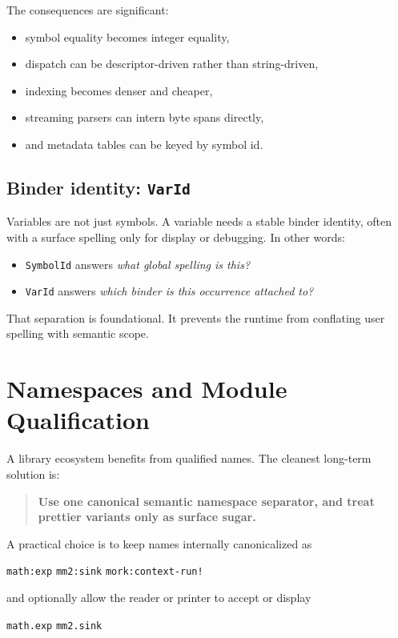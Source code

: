\documentclass[11pt]{article}
\newcommand{\symid}{\texttt{SymbolId}}
\newcommand{\varid}{\texttt{VarId}}
\begin{document}
The consequences are significant:
\begin{itemize}[leftmargin=2em]
  \item symbol equality becomes integer equality,
  \item dispatch can be descriptor-driven rather than string-driven,
  \item indexing becomes denser and cheaper,
  \item streaming parsers can intern byte spans directly,
  \item and metadata tables can be keyed by symbol id.
\end{itemize}

\subsection{Binder identity: \varid{}}

Variables are not just symbols. A variable needs a stable binder identity, often with a surface spelling only for display or debugging. In other words:
\begin{itemize}[leftmargin=2em]
  \item \symid{} answers \emph{what global spelling is this?}
  \item \varid{} answers \emph{which binder is this occurrence attached to?}
\end{itemize}

That separation is foundational. It prevents the runtime from conflating user spelling with semantic scope.

\section{Namespaces and Module Qualification}

A library ecosystem benefits from qualified names. The cleanest long-term solution is:
\begin{quote}
\textbf{Use one canonical semantic namespace separator, and treat prettier variants only as surface sugar.}
\end{quote}

A practical choice is to keep names internally canonicalized as
\begin{center}
\texttt{math:exp} \qquad \texttt{mm2:sink} \qquad \texttt{mork:context-run!}
\end{center}

and optionally allow the reader or printer to accept or display
\begin{center}
\texttt{math.exp} \qquad \texttt{mm2.sink}
\end{center}
\end{document}
